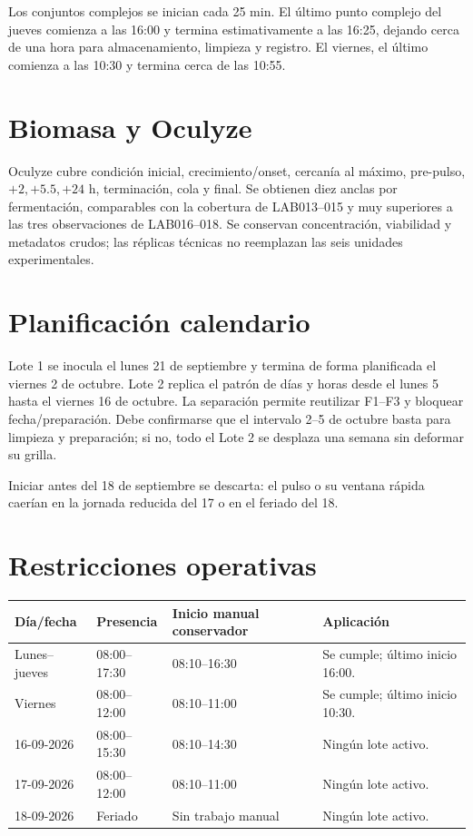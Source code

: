 \documentclass[11pt,a4paper]{article}
\begin{document}
Los conjuntos complejos se inician cada 25 min. El último punto complejo del
jueves comienza a las 16:00 y termina estimativamente a las 16:25, dejando cerca
de una hora para almacenamiento, limpieza y registro. El viernes, el último
comienza a las 10:30 y termina cerca de las 10:55.

\section{Biomasa y Oculyze}

Oculyze cubre condición inicial, crecimiento/onset, cercanía al máximo,
pre-pulso, \(+2,+5.5,+24\) h, terminación, cola y final. Se obtienen diez anclas
por fermentación, comparables con la cobertura de LAB013--015 y muy superiores a
las tres observaciones de LAB016--018. Se conservan concentración, viabilidad y
metadatos crudos; las réplicas técnicas no reemplazan las seis unidades
experimentales.

\section{Planificación calendario}

Lote 1 se inocula el lunes 21 de septiembre y termina de forma planificada el
viernes 2 de octubre. Lote 2 replica el patrón de días y horas desde el lunes 5
hasta el viernes 16 de octubre. La separación permite reutilizar F1--F3 y bloquear
fecha/preparación. Debe confirmarse que el intervalo 2--5 de octubre basta para
limpieza y preparación; si no, todo el Lote 2 se desplaza una semana sin deformar
su grilla.

Iniciar antes del 18 de septiembre se descarta: el pulso o su ventana rápida
caerían en la jornada reducida del 17 o en el feriado del 18.

\section{Restricciones operativas}

\begin{table}[ht]
\centering
\small
\begin{tabularx}{\textwidth}{@{}l l l Y@{}}
\toprule
Día/fecha & Presencia & Inicio manual conservador & Aplicación\\
\midrule
Lunes--jueves & 08:00--17:30 & 08:10--16:30 & Se cumple; último inicio 16:00.\\
Viernes & 08:00--12:00 & 08:10--11:00 & Se cumple; último inicio 10:30.\\
16-09-2026 & 08:00--15:30 & 08:10--14:30 & Ningún lote activo.\\
17-09-2026 & 08:00--12:00 & 08:10--11:00 & Ningún lote activo.\\
18-09-2026 & Feriado & Sin trabajo manual & Ningún lote activo.\\
\bottomrule
\end{tabularx}
\end{table}
\end{document}
